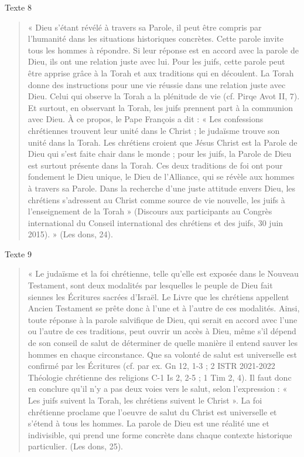 Texte  8 \begin{quote}
    «  Dieu  s’étant  révélé  à  travers  sa  Parole,  il  peut  être  compris  par  l’humanité  dans  les  situations historiques  concrètes.  Cette  parole  invite  tous  les  hommes  à  répondre.  Si  leur  réponse  est  en accord  avec  la  parole  de  Dieu,  ils  ont  une  relation  juste  avec  lui.  Pour  les  juifs,  cette  parole peut  être  apprise  grâce  à  la  Torah  et  aux  traditions  qui  en  découlent.  La  Torah  donne  des instructions  pour  une  vie  réussie  dans  une  relation  juste  avec  Dieu.  Celui  qui  observe  la  Torah a  la  plénitude  de  vie  (cf.  Pirqe  Avot  II,  7).  Et  surtout,  en  observant  la  Torah,  les  juifs  prennent part  à  la  communion  avec  Dieu.  À  ce  propos,  le  Pape  François  a  dit  :  «  Les  confessions chrétiennes  trouvent  leur  unité  dans  le  Christ  ;  le  judaïsme  trouve  son  unité  dans  la  Torah.  Les chrétiens  croient  que  Jésus  Christ  est  la  Parole  de  Dieu  qui  s’est  faite  chair  dans  le  monde  ; pour  les  juifs,  la  Parole  de  Dieu  est  surtout  présente  dans  la  Torah.  Ces  deux  traditions  de  foi ont  pour  fondement  le  Dieu  unique,  le  Dieu  de  l’Alliance,  qui  se  révèle  aux  hommes  à  travers sa  Parole.  Dans  la  recherche  d’une  juste  attitude  envers  Dieu,  les  chrétiens  s’adressent  au Christ  comme  source  de  vie  nouvelle,  les  juifs  à  l’enseignement  de  la  Torah  »  (Discours  aux participants  au  Congrès  international  du  Conseil  international  des  chrétiens  et  des  juifs,  30 juin 2015).  »  (Les  dons, 24). 
\end{quote} 

Texte  9 \begin{quote}
    «  Le  judaïsme  et  la  foi  chrétienne,  telle  qu’elle  est  exposée  dans  le  Nouveau  Testament,  sont deux  modalités  par  lesquelles  le  peuple  de  Dieu  fait  siennes  les  Écritures  sacrées  d’Israël.  Le Livre  que  les  chrétiens  appellent  Ancien  Testament  se  prête  donc  à  l’une  et  à  l’autre  de  ces modalités.  Ainsi,  toute  réponse  à  la  parole  salvifique  de  Dieu,  qui  serait  en  accord  avec  l’une ou  l’autre  de  ces  traditions,  peut  ouvrir  un  accès  à  Dieu,  même  s’il  dépend  de  son  conseil  de salut  de  déterminer  de  quelle  manière  il  entend  sauver  les  hommes  en  chaque  circonstance. Que  sa  volonté  de  salut  est  universelle  est  confirmé  par  les  Écritures  (cf.  par  ex.  Gn  12,  1-3  ; 2 ISTR  2021-2022  Théologie  chrétienne  des  religions  C-1 Is  2,  2-5  ;  1  Tim  2,  4).  Il  faut  donc  en  conclure  qu’il  n’y  a  pas  deux  voies  vers  le  salut,  selon l’expression  :  «  Les  juifs  suivent  la  Torah,  les  chrétiens  suivent  le  Christ  ».  La  foi  chrétienne proclame  que  l’oeuvre  de  salut  du  Christ  est  universelle  et  s’étend  à  tous  les  hommes.  La parole  de  Dieu  est  une  réalité  une  et  indivisible,  qui  prend  une  forme  concrète  dans  chaque contexte  historique  particulier. (Les  dons, 25). 
\end{quote} 

